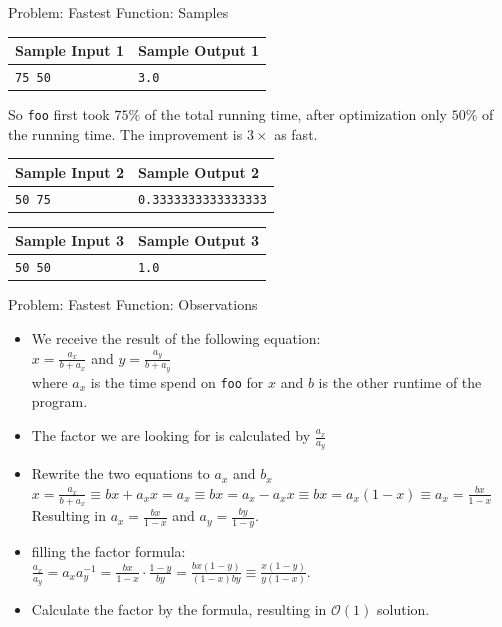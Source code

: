 \documentclass[11pt,pdf, aspectratio=169]{beamer}
\begin{document}
  \begin{frame}{Problem: Fastest Function: Samples}
    \begin{tabular}{|l|l|}
      \hline
      \textbf{Sample Input 1} & \textbf{Sample Output 1} \\
      \hline
      \texttt{75 50}          & \texttt{3.0}             \\
      \hline
    \end{tabular}

    So \texttt{foo} first took $75\%$ of the total running time, after optimization only $50\%$ of the running time.
    The improvement is $3\times$ as fast.


    \begin{tabular}{|l|l|}
      \hline
      \textbf{Sample Input 2} & \textbf{Sample Output 2}    \\
      \hline
      \texttt{50 75}          & \texttt{0.3333333333333333} \\
      \hline
    \end{tabular}


    \begin{tabular}{|l|l|}
      \hline
      \textbf{Sample Input 3} & \textbf{Sample Output 3} \\
      \hline
      \texttt{50 50}          & \texttt{1.0}             \\
      \hline
    \end{tabular}
  \end{frame}
  \begin{frame}{Problem: Fastest Function: Observations}
    \begin{itemize}
      \item We receive the result of the following equation:\\$x=\frac{a_x}{b+a_x}$ and $y=\frac{a_y}{b+a_y}$\\ where $a_x$ is the time spend on \texttt{foo} for $x$ and $b$ is the other runtime of the program.
      \item The factor we are looking for is calculated by $\frac{a_x}{a_y}$
      \item Rewrite the two equations to $a_x$ and $b_x$\\$x=\frac{a_x}{b+a_x} \equiv bx+a_{x}x = a_x \equiv bx = a_x - a_{x}x \equiv bx = a_x(1-x) \equiv a_x = \frac{bx}{1-x}$\\ Resulting in $a_x=\frac{bx}{1-x}$ and $a_y=\frac{by}{1-y}$.
      \item filling the factor formula:\\ $\frac{a_x}{a_y}= a_{x}a_{y}^{-1} = \frac{bx}{1-x}\cdot\frac{1-y}{by} = \frac{bx(1-y)}{(1-x)by} \equiv \frac{x(1-y)}{y(1-x)}$.
      \item Calculate the factor by the formula, resulting in $\mathcal{O}(1)$ solution.
    \end{itemize}
  \end{frame}
\end{document}
